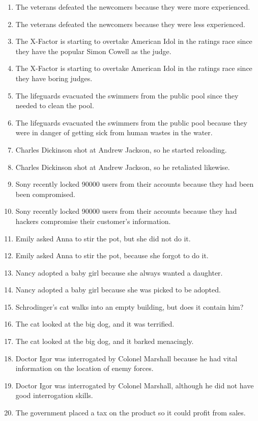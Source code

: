 \documentclass{article}
\begin{document}
\begin{enumerate}
	\item The veterans defeated the newcomers because they were more experienced.
	\item The veterans defeated the newcomers because they were less experienced.
	\item The X-Factor is starting to overtake American Idol in the ratings race since they have the popular Simon Cowell as the judge.
	\item The X-Factor is starting to overtake American Idol in the ratings race since they have boring judges.
	\item The lifeguards evacuated the swimmers from the public pool since they needed to clean the pool.
	\item The lifeguards evacuated the swimmers from the public pool because they were in danger of getting sick from human wastes in the water.
	\item Charles Dickinson shot at Andrew Jackson, so he started reloading.
	\item Charles Dickinson shot at Andrew Jackson, so he retaliated likewise.
	\item Sony recently locked 90000 users from their accounts because they had been been compromised.
	\item Sony recently locked 90000 users from their accounts because they had hackers compromise their customer's information.
	\item Emily asked Anna to stir the pot, but she did not do it.
	\item Emily asked Anna to stir the pot, because she forgot to do it.
	\item Nancy adopted a baby girl because she always wanted a daughter.
	\item Nancy adopted a baby girl because she was picked to be adopted.
	\item Schrodinger's cat walks into an empty building, but does it contain him?
	\item The cat looked at the big dog, and it was terrified.
	\item The cat looked at the big dog, and it barked menacingly.
	\item Doctor Igor was interrogated by Colonel Marshall because he had vital information on the location of enemy forces.
	\item Doctor Igor was interrogated by Colonel Marshall, although he did not have good interrogation skills.
	\item The government placed a tax on the product so it could profit from sales.

\end{enumerate}
\end{document}
